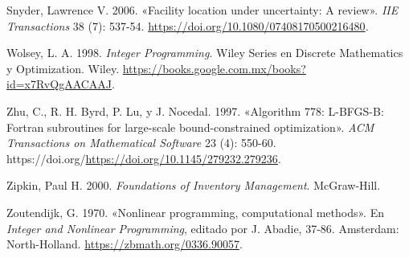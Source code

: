 \documentclass[
  spanish,
  us-letterpaper,
  DIV=11,
  numbers=noendperiod]{scrreprt}
\newlength{\cslhangindent}
\newenvironment{CSLReferences}[2] %
 {\begin{list}{}{%
  \setlength{\itemindent}{0pt}
  \setlength{\leftmargin}{0pt}
  \setlength{\parsep}{0pt}
  \ifodd #1
   \setlength{\leftmargin}{\cslhangindent}
   \setlength{\itemindent}{-1\cslhangindent}
  \fi
  \setlength{\itemsep}{#2\baselineskip}}}
 {\end{list}}
\numberwithin{equation}{section}
\begin{document}
\begin{CSLReferences}{1}{0}
Snyder, Lawrence V. 2006. {«Facility location under uncertainty: A
review»}. \emph{IIE Transactions} 38 (7): 537-54.
\url{https://doi.org/10.1080/07408170500216480}.

Wolsey, L. A. 1998. \emph{Integer Programming}. Wiley Series en Discrete
Mathematics y Optimization. Wiley.
\url{https://books.google.com.mx/books?id=x7RvQgAACAAJ}.

Zhu, C., R. H. Byrd, P. Lu, y J. Nocedal. 1997. {«Algorithm 778:
L-BFGS-B: Fortran subroutines for large-scale bound-constrained
optimization»}. \emph{ACM Transactions on Mathematical Software} 23 (4):
550-60. https://doi.org/\url{https://doi.org/10.1145/279232.279236}.

Zipkin, Paul H. 2000. \emph{Foundations of Inventory Management}.
McGraw-Hill.

Zoutendijk, G. 1970. {«Nonlinear programming, computational methods»}.
En \emph{Integer and Nonlinear Programming}, editado por J. Abadie,
37-86. Amsterdam: North-Holland. \url{https://zbmath.org/0336.90057}.

\end{CSLReferences}
\end{document}
